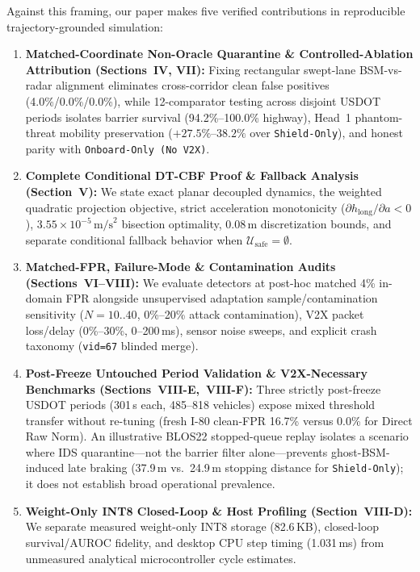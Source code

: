 \documentclass[journal]{IEEEtran}
\begin{document}
Against this framing, our paper makes five verified contributions in reproducible trajectory-grounded simulation:
\begin{enumerate}
    \item \textbf{Matched-Coordinate Non-Oracle Quarantine \& Controlled-Ablation Attribution (Sections~IV, VII):} Fixing rectangular swept-lane BSM-vs-radar alignment eliminates cross-corridor clean false positives (4.0\%/0.0\%/0.0\%), while 12-comparator testing across disjoint USDOT periods isolates barrier survival (94.2\%--100.0\% highway), Head~1 phantom-threat mobility preservation ($+27.5\%$--$38.2\%$ over \texttt{Shield-Only}), and honest parity with \texttt{Onboard-Only (No V2X)}.
    \item \textbf{Complete Conditional DT-CBF Proof \& Fallback Analysis (Section~V):} We state exact planar decoupled dynamics, the weighted quadratic projection objective, strict acceleration monotonicity ($\partial h_{\text{long}}/\partial a < 0$), $3.55\times 10^{-5}\,\text{m/s}^2$ bisection optimality, $0.08\,\text{m}$ discretization bounds, and separate conditional fallback behavior when $\mathcal{U}_{\text{safe}}=\emptyset$.
    \item \textbf{Matched-FPR, Failure-Mode \& Contamination Audits (Sections~VI--VIII):} We evaluate detectors at post-hoc matched 4\% in-domain FPR alongside unsupervised adaptation sample/contamination sensitivity ($N=10..40$, 0\%--20\% attack contamination), V2X packet loss/delay (0\%--30\%, 0--200\,ms), sensor noise sweeps, and explicit crash taxonomy (\texttt{vid=67} blinded merge).
    \item \textbf{Post-Freeze Untouched Period Validation \& V2X-Necessary Benchmarks (Sections~VIII-E,~VIII-F):} Three strictly post-freeze USDOT periods (301\,s each, 485--818 vehicles) expose mixed threshold transfer without re-tuning (fresh I-80 clean-FPR 16.7\% versus 0.0\% for Direct Raw Norm). An illustrative BLOS22 stopped-queue replay isolates a scenario where IDS quarantine---not the barrier filter alone---prevents ghost-BSM-induced late braking (37.9\,m vs.\ 24.9\,m stopping distance for \texttt{Shield-Only}); it does not establish broad operational prevalence.
    \item \textbf{Weight-Only INT8 Closed-Loop \& Host Profiling (Section~VIII-D):} We separate measured weight-only INT8 storage (82.6\,KB), closed-loop survival/AUROC fidelity, and desktop CPU step timing (1.031\,ms) from unmeasured analytical microcontroller cycle estimates.
\end{enumerate}
\end{document}
